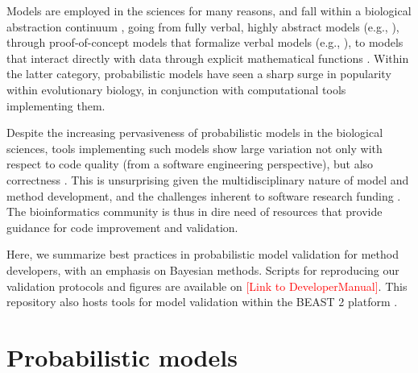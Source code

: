 \documentclass[oneside]{article}
\begin{document}
Models are employed in the sciences for many reasons, and fall within
a biological abstraction continuum \citep{servedio14}, going from
fully verbal, highly abstract models (e.g., \citealt{vanvalen73}),
through proof-of-concept models that formalize verbal models (e.g.,
\citealt{maynard78,reinhold99,mendes18}), to models that
interact directly with data through explicit mathematical
functions \citep{yule24,felsenstein73,hky,hudson90}.
Within the latter category, probabilistic models have seen a sharp surge
in popularity within evolutionary biology, in conjunction
with computational tools implementing them.

Despite the increasing pervasiveness of probabilistic models in the
biological sciences, tools implementing such models show large
variation not only with respect to code quality (from a software engineering
perspective), but also correctness \citep{darriba18}.
This is unsurprising given the multidisciplinary nature of model and method
development, and the challenges inherent to software research funding
\citep{siepel19}.
The bioinformatics community is thus in dire need of resources that
provide guidance for code improvement and validation.

Here, we summarize best practices in probabilistic model validation for method
developers, with an emphasis on Bayesian methods.
Scripts for reproducing our validation protocols and figures are available on
\textcolor{red}{[Link to DeveloperManual]}.
This repository also hosts tools for model validation within the BEAST 2 platform
\citep{beast25}.



\section*{Probabilistic models}
\end{document}
